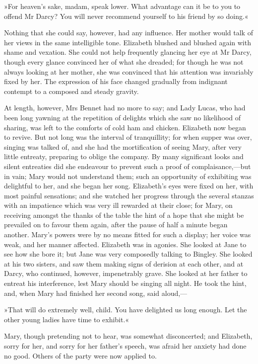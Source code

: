»For heaven's sake, madam, speak lower. What advantage can it be to you to offend Mr Darcy? You will never recommend yourself to his friend by so doing.«

Nothing that she could say, however, had any influence. Her mother would talk of her views in the same intelligible tone. Elizabeth blushed and blushed again with shame and vexation. She could not help frequently glancing her eye at Mr Darcy, though every glance convinced her of what she dreaded; for though he was not always looking at her mother, she was convinced that his attention was invariably fixed by her. The expression of his face changed gradually from indignant contempt to a composed and steady gravity.

At length, however, Mrs Bennet had no more to say; and Lady Lucas, who had been long yawning at the repetition of delights which she saw no likelihood of sharing, was left to the comforts of cold ham and chicken. Elizabeth now began to revive. But not long was the interval of tranquillity; for when supper was over, singing was talked of, and she had the mortification of seeing Mary, after very little entreaty, preparing to oblige the company. By many significant looks and silent entreaties did she endeavour to prevent such a proof of complaisance,—but in vain; Mary would not understand them; such an opportunity of exhibiting was delightful to her, and she began her song. Elizabeth's eyes were fixed on her, with most painful sensations; and she watched her progress through the several stanzas with an impatience which was very ill rewarded at their close; for Mary, on receiving amongst the thanks of the table the hint of a hope that she might be prevailed on to favour them again, after the pause of half a minute began another. Mary's powers were by no means fitted for such a display; her voice was weak, and her manner affected. Elizabeth was in agonies. She looked at Jane to see how she bore it; but Jane was very composedly talking to Bingley. She looked at his two sisters, and saw them making signs of derision at each other, and at Darcy, who continued, however, impenetrably grave. She looked at her father to entreat his interference, lest Mary should be singing all night. He took the hint, and, when Mary had finished her second song, said aloud,—

»That will do extremely well, child. You have delighted us long enough. Let the other young ladies have time to exhibit.«

Mary, though pretending not to hear, was somewhat disconcerted; and Elizabeth, sorry for her, and sorry for her father's speech, was afraid her anxiety had done no good. Others of the party were now applied to.

